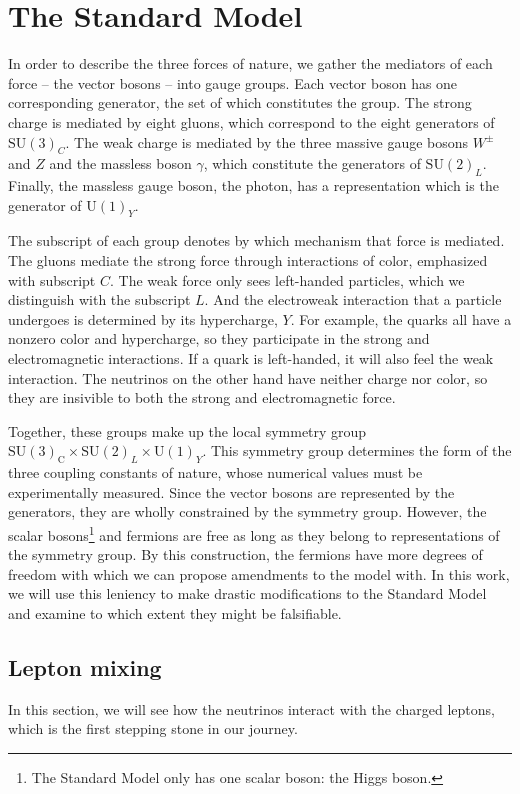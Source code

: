 % 
\section{The Standard Model}\label{ch:SM}
In order to describe the three forces of nature, we gather the mediators of each force -- the vector bosons -- into gauge groups. 
Each vector boson has one corresponding generator, the set of which constitutes the group.
The strong charge is mediated by eight gluons, which correspond to the eight generators of $\text{SU}(3)_C$. 
The weak charge is mediated by the three massive gauge bosons $W^\pm$ and $Z$ and the massless boson $\gamma$, 
which constitute the generators of $\text{SU}(2)_L$. Finally, the massless gauge boson, the photon, has a representation which is the generator of $\text{U}(1)_Y$. 

The subscript of each group denotes by which mechanism that force is mediated. The gluons mediate the strong force through interactions of color, emphasized with subscript $C$. The weak force only sees left-handed particles, 
which we distinguish with the subscript $L$. And the electroweak interaction that a particle undergoes is determined by its hypercharge, $Y$. For example, the quarks all have a nonzero color and hypercharge, 
so they participate in the strong and electromagnetic interactions. If a quark is left-handed, it will also feel the weak interaction. The neutrinos on the other hand have neither charge nor color, so they are insivible to both the strong and electromagnetic force.

Together, these groups make up the local symmetry group $\mathrm{SU}(3)_{\mathrm{C}} \times \mathrm{SU}(2)_{L} \times \mathrm{U}(1)_{Y}$. 
This symmetry group determines the form of the three coupling constants of nature, whose numerical values must be experimentally measured. 
Since the vector bosons are represented by the generators, they are wholly constrained by the symmetry group. However, the scalar bosons\footnote{The Standard Model only has one scalar boson: the Higgs boson.} and fermions are free as long as they
belong to representations of the symmetry group. By this construction, the fermions have more degrees of freedom with which we can propose amendments to the model with. In this work,
we will use this leniency to make drastic modifications to the Standard Model and examine to which extent they might be falsifiable.


\subsection{Lepton mixing}
In this section, we will see how the neutrinos interact with the charged leptons, which is the first stepping stone in our journey.

